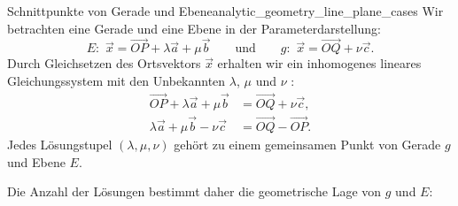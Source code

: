 \begin{KeyPointBox}{Schnittpunkte von Gerade und Ebene}{analytic_geometry_line_plane_cases}
  Wir betrachten eine Gerade und eine Ebene in der Parameterdarstellung:
  \[
    E\mathord{:}\enspace \vec x=\overrightarrow{OP}+\lambda\vec a+\mu\vec b
    \qquad\text{und}\qquad
    g\mathord{:}\enspace \vec x=\overrightarrow{OQ}+\nu\vec c.
  \]
  Durch Gleichsetzen des Ortsvektors $\vec x$ erhalten wir ein inhomogenes lineares
  Gleichungssystem mit den Unbekannten $\lambda$, $\mu$ und $\nu$ :
  \[
    \begin{aligned}
      \overrightarrow{OP}+\lambda\vec a+\mu\vec b
        &=\overrightarrow{OQ}+\nu\vec c,\\[0.4em]
      \lambda\vec a+\mu\vec b-\nu\vec c
        &=\overrightarrow{OQ}-\overrightarrow{OP}.
    \end{aligned}
  \]
  Jedes Lösungstupel $(\lambda,\mu,\nu)$ gehört zu einem gemeinsamen Punkt
  von Gerade $g$ und Ebene $E$.

  \par\medskip
  Die Anzahl der Lösungen bestimmt daher die geometrische Lage von $g$ und $E$:
  \begin{center}
  \end{center}
\end{KeyPointBox}

